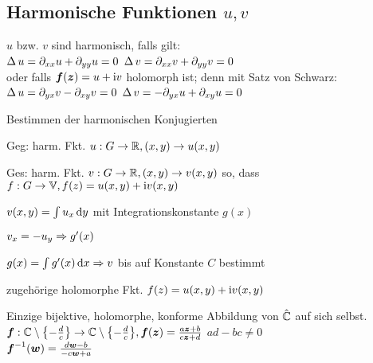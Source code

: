 \documentclass[german,color,5pt]{latex4ei/latex4ei_fs}
\begin{document}
\begin{sectionbox}
	\subsection{Harmonische Funktionen $u,v$}
	$u$ bzw. $v$ sind harmonisch, falls gilt:\\
	$\operatorname{\Delta} u = \partial_{xx} u + \partial_{yy} u = 0$ \qquad\quad $\operatorname{\Delta} v = \partial_{xx} v + \partial_{yy} v = 0$\\[0.5em]
	oder falls $\boldsymbol{f}(\boldsymbol{z}) = u + \mathrm{i} v$ holomorph ist; denn mit Satz von Schwarz:\\
	$\operatorname{\Delta} u = \partial_{yx} v - \partial_{xy} v = 0$ \qquad\quad $\operatorname{\Delta} v = - \partial_{yx} u + \partial_{xy} u = 0$
	\begin{cookbox}{Bestimmen der harmonischen Konjugierten}
			\item Geg: harm. Fkt. $u: G \rightarrow \mathbb R, (x,y) \rightarrow u(x,y)$
			\item Ges: harm. Fkt. $v: G \rightarrow \mathbb R, (x,y) \rightarrow v(x,y)$
			so, dass $f: G \rightarrow \mathbb V, f(z) = u(x,y) + \mathrm{i} v (x,y)$
			\item $v(x,y) = \int u_x \diff y$ mit Integrationskonstante $g(x)$
			\item $v_x = -u_y \Rightarrow g'(x)$
			\item $g(x) = \int g'(x) \diff x \Ra v$ bis auf Konstante $C$ bestimmt
			\item zugehörige holomorphe Fkt.
			$f (z) = u (x,y) + \mathrm{i} v(x,y)$
	\end{cookbox}
\end{sectionbox}

\begin{sectionbox}
	Einzige bijektive, holomorphe, konforme Abbildung von $\hat {\mathbb C}$ auf sich selbst.\\
	$\boldsymbol{f}:\mathbb C \setminus \bigl\{-\frac{d}{c}\bigr\} \rightarrow \mathbb C \setminus \bigl\{-\frac{d}{c}\bigr\}, \boldsymbol{f}(\boldsymbol{z}) = \frac{a\boldsymbol{z} + b}{c\boldsymbol{z} + d}$ \qquad $ad - bc \ne 0$\\ 
	$\boldsymbol{f}^{-1}(\boldsymbol{w}) = \frac{d\boldsymbol{w} - b}{-c \boldsymbol{w} + a}$
\end{sectionbox}
\end{document}
